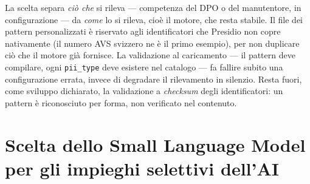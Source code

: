 La scelta separa \emph{ciò che} si rileva --- competenza del DPO o del manutentore, in configurazione --- da \emph{come} lo si rileva, cioè il motore, che resta stabile. Il file dei pattern personalizzati è riservato agli identificatori che Presidio non copre nativamente (il numero AVS svizzero ne è il primo esempio), per non duplicare ciò che il motore già fornisce. La validazione al caricamento --- il pattern deve compilare, ogni \texttt{pii\_type} deve esistere nel catalogo --- fa fallire subito una configurazione errata, invece di degradare il rilevamento in silenzio. Resta fuori, come sviluppo dichiarato, la validazione a \emph{checksum} degli identificatori: un pattern è riconosciuto per forma, non verificato nel contenuto.


\section{Scelta dello Small Language Model per gli impieghi selettivi dell'AI}
\label{sec:scelta-modello-llm}


